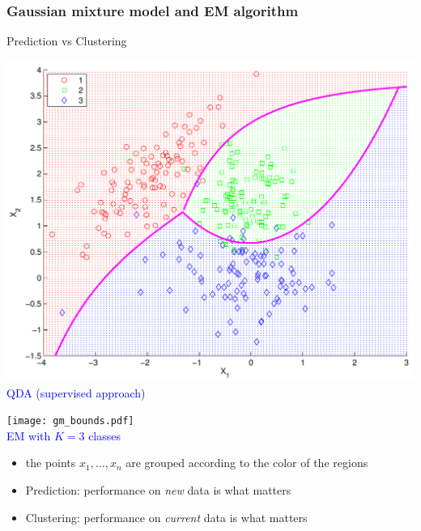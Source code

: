 \documentclass[compress, smaller, serif, 9pt]{beamer}
\begin{document}
\begin{frame}
   \frametitle{Gaussian mixture model and EM algorithm}
   \begin{block}{Prediction vs Clustering}
   \end{block}
   \begin{minipage}{.49\textwidth}
   \begin{center}
    \includegraphics[width=.95\textwidth]{Figs/S02/quad_analysis_bounds.pdf}\\
    \textcolor{blue}{QDA  (supervised approach)}
    \end{center}
    \end{minipage} \hfill
    \begin{minipage}{.49\textwidth}
   \begin{center}
    \texttt{[image: gm\_bounds.pdf]}\\
    \textcolor{blue}{EM with $K=3$ classes}
    \end{center}
    \end{minipage}
    \begin{itemize}
       \item the points $x_1,\ldots,x_n$ are grouped according to the color of the regions
       \item Prediction: performance on {\em new} data is what matters
       \item Clustering: performance on {\em current} data is what matters
    \end{itemize}
\end{frame}
\end{document}
